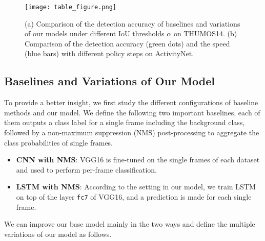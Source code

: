 \documentclass{bmvc2k}
\begin{document}
\begin{figure}[t]
	\centering
	\texttt{[image: table\_figure.png]}
	\caption {(a) Comparison of the detection accuracy of baselines and variations of our models under different IoU thresholds $\alpha$ on THUMOS14. (b) Comparison of the detection accuracy (green dots) and the speed (blue bars) with different policy steps on ActivityNet.}
	\label{fig:table_figure}
\end{figure}


\subsection{Baselines and Variations of Our Model}


To provide a better insight, we first study the different configurations of baseline methods and our model. We define the following two important baselines, each of them outputs a class label for a single frame including the background class, followed by a non-maximum suppression (NMS) post-processing to aggregate the class probabilities of single frames. 

\begin{itemize}[noitemsep,topsep=0pt]
	\item \textbf{CNN with NMS}: VGG16 is fine-tuned on the single frames of each dataset and used to perform per-frame classification.
	\item \textbf{LSTM with NMS}: According to the setting in our model, we train LSTM on top of the layer \texttt{fc7} of VGG16, and a prediction is made for each single frame. %
\end{itemize}

\noindent We can improve our base model mainly in the two ways and define the multiple variations of our model as follows. 
\end{document}
